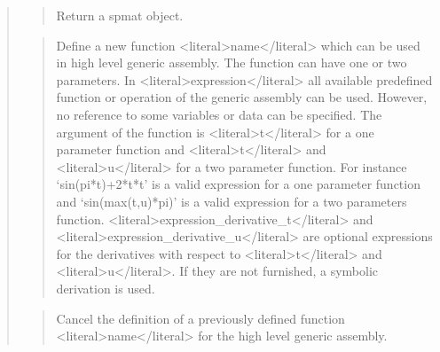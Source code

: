 \documentclass[a4paper,11pt,english]{sphinxmanual}
\begin{document}
\begin{quote}
\begin{quote}
\sphinxAtStartPar
Return a spmat object.
\end{quote}

\sphinxAtStartPar
{}
\begin{quote}

\sphinxAtStartPar
Define a new function \textless{}literal\textgreater{}name\textless{}/literal\textgreater{} which can be used in high level
generic assembly. The function can have one or two parameters.
In \textless{}literal\textgreater{}expression\textless{}/literal\textgreater{} all available predefined function or operation
of the generic assembly can be used. However, no reference to
some variables or data can be specified. The argument of the
function is \textless{}literal\textgreater{}t\textless{}/literal\textgreater{} for a one parameter function and \textless{}literal\textgreater{}t\textless{}/literal\textgreater{} and \textless{}literal\textgreater{}u\textless{}/literal\textgreater{}
for a two parameter function. For instance ‘sin(pi*t)+2*t*t’
is a valid expression for a one parameter function and
‘sin(max(t,u)*pi)’ is a valid expression for a two parameters
function. \textless{}literal\textgreater{}expression\_derivative\_t\textless{}/literal\textgreater{} and \textless{}literal\textgreater{}expression\_derivative\_u\textless{}/literal\textgreater{}
are optional expressions for the derivatives with respect
to \textless{}literal\textgreater{}t\textless{}/literal\textgreater{} and \textless{}literal\textgreater{}u\textless{}/literal\textgreater{}. If they are not furnished, a symbolic derivation
is used.
\end{quote}

\sphinxAtStartPar
{}
\begin{quote}

\sphinxAtStartPar
Cancel the definition of a previously defined function \textless{}literal\textgreater{}name\textless{}/literal\textgreater{}
for the high level generic assembly.
\end{quote}

\sphinxAtStartPar
{}
\begin{quote}


\end{quote}
\end{quote}
\end{document}
